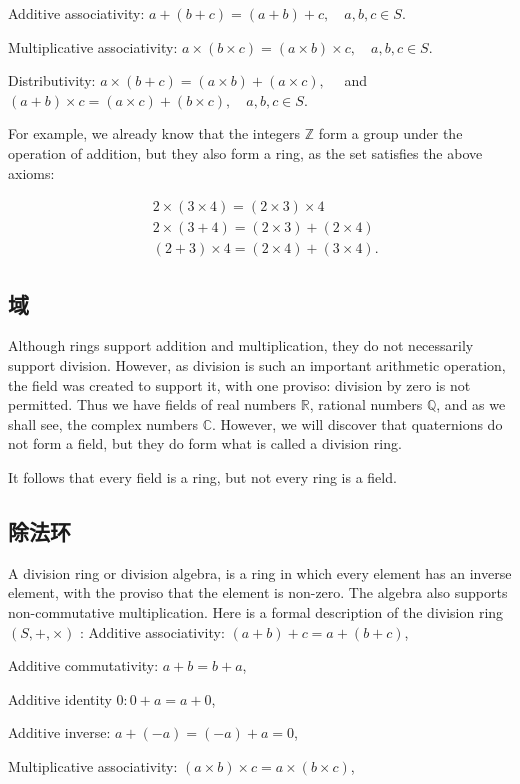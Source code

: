 Additive associativity: $a+(b+c)=(a+b)+c, \quad a, b, c \in S$.

Multiplicative associativity: $a \times(b \times c)=(a \times b) \times c, \quad a, b, c \in S$.

Distributivity: $a \times(b+c)=(a \times b)+(a \times c), \quad$ and $(a+b) \times c=(a \times c)+(b \times c), \quad a, b, c \in S$.

For example, we already know that the integers $\mathbb{Z}$ form a group under the operation of addition, but they also form a ring, as the set satisfies the above axioms:

$$
\begin{aligned}
& 2 \times(3 \times 4)=(2 \times 3) \times 4 \\
& 2 \times(3+4)=(2 \times 3)+(2 \times 4) \\
& (2+3) \times 4=(2 \times 4)+(3 \times 4) .
\end{aligned}
$$

\subsection{域}
Although rings support addition and multiplication, they do not necessarily support division. However, as division is such an important arithmetic operation, the field was created to support it, with one proviso: division by zero is not permitted. Thus we have fields of real numbers $\mathbb{R}$, rational numbers $\mathbb{Q}$, and as we shall see, the complex numbers $\mathbb{C}$. However, we will discover that quaternions do not form a field, but they do form what is called a division ring.

It follows that every field is a ring, but not every ring is a field.

\subsection{除法环}
A division ring or division algebra, is a ring in which every element has an inverse element, with the proviso that the element is non-zero. The algebra also supports non-commutative multiplication. Here is a formal description of the division ring $(S,+, \times)$ : Additive associativity: $(a+b)+c=a+(b+c)$,

Additive commutativity: $a+b=b+a$,

Additive identity $0: 0+a=a+0$,

Additive inverse: $a+(-a)=(-a)+a=0$,

Multiplicative associativity: $(a \times b) \times c=a \times(b \times c)$,

